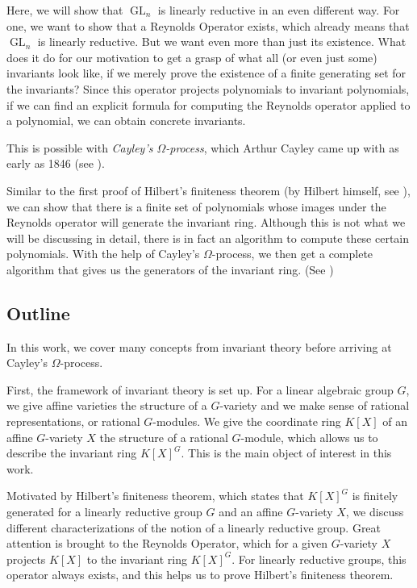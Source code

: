 Here, we will show that $\operatorname{GL}_n$ is linearly reductive in an even different way.
For one, we want to show that a Reynolds Operator exists, which already means that $\operatorname{GL}_n$ is linearly reductive.
But we want even more than just its existence.
What does it do for our motivation to get a grasp of what all (or even just some) invariants look like, if we merely prove the existence of a finite generating set for the invariants?
Since this operator projects polynomials to invariant polynomials, if we can find an explicit formula for computing the Reynolds operator applied to a polynomial, we can obtain concrete invariants.

This is possible with \textit{Cayley's $\Omega$-process}, which Arthur Cayley came up with as early as 1846 (see \cite{Cay46}).

Similar to the first proof of Hilbert's finiteness theorem (by Hilbert himself, see \cite{Hil90}), we can show that there is a finite set of polynomials whose images under the Reynolds operator will generate the invariant ring.
Although this is not what we will be discussing in detail, there is in fact an algorithm to compute these certain polynomials.
With the help of Cayley's $\Omega$-process, we then get a complete algorithm that gives us the generators of the invariant ring.
(See \cite[4.1.9]{DK15})

\subsection{Outline}
In this work, we cover many concepts from invariant theory before arriving at Cayley's $\Omega$-process.

First, the framework of invariant theory is set up.
For a linear algebraic group $G$, we give affine varieties the structure of a $G$-variety and we make sense of rational representations, or rational $G$-modules.
We give the coordinate ring $K[X]$ of an affine $G$-variety $X$ the structure of a rational $G$-module, which allows us to describe the invariant ring $K[X]^G$.
This is the main object of interest in this work.

Motivated by Hilbert's finiteness theorem, which states that $K[X]^G$ is finitely generated for a linearly reductive group $G$ and an affine $G$-variety $X$, we discuss different characterizations of the notion of a linearly reductive group.
Great \linebreak attention is brought to the Reynolds Operator, which for a given $G$-variety $X$ projects $K[X]$ to the invariant ring $K[X]^G$.
For linearly reductive groups, this operator always exists, and this helps us to prove Hilbert's finiteness theorem.

